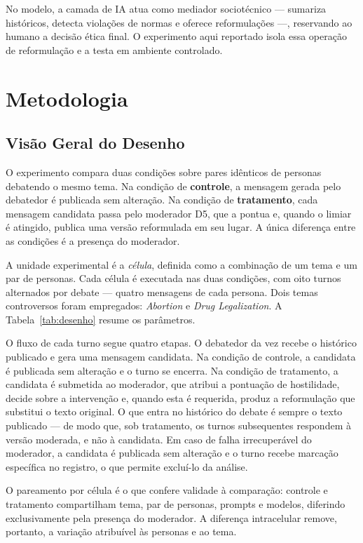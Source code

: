 \documentclass[conference]{IEEEtran} \IEEEoverridecommandlockouts %
\begin{document}
No modelo, a camada de IA atua como mediador sociotécnico — sumariza
históricos, detecta violações de normas e oferece reformulações —, reservando
ao humano a decisão ética final. O experimento aqui reportado isola essa
operação de reformulação e a testa em ambiente controlado.

\section{Metodologia}

\subsection{Visão Geral do Desenho}

O experimento compara duas condições sobre pares idênticos de personas
debatendo o mesmo tema. Na condição de \textbf{controle}, a mensagem gerada
pelo debatedor é publicada sem alteração. Na condição de \textbf{tratamento},
cada mensagem candidata passa pelo moderador D5, que a pontua e, quando o
limiar é atingido, publica uma versão reformulada em seu lugar. A única
diferença entre as condições é a presença do moderador.

A unidade experimental é a \textit{célula}, definida como a combinação de um
tema e um par de personas. Cada célula é executada nas duas condições, com
oito turnos alternados por debate — quatro mensagens de cada persona. Dois
temas controversos foram empregados: \textit{Abortion} e \textit{Drug
Legalization}. A Tabela~\ref{tab:desenho} resume os parâmetros.

O fluxo de cada turno segue quatro etapas. O debatedor da vez recebe o
histórico publicado e gera uma mensagem candidata. Na condição de controle, a
candidata é publicada sem alteração e o turno se encerra. Na condição de
tratamento, a candidata é submetida ao moderador, que atribui a pontuação de
hostilidade, decide sobre a intervenção e, quando esta é requerida, produz a
reformulação que substitui o texto original. O que entra no histórico do debate
é sempre o texto publicado — de modo que, sob tratamento, os turnos
subsequentes respondem à versão moderada, e não à candidata. Em caso de falha
irrecuperável do moderador, a candidata é publicada sem alteração e o turno
recebe marcação específica no registro, o que permite excluí-lo da análise.

O pareamento por célula é o que confere validade à comparação: controle e
tratamento compartilham tema, par de personas, prompts e modelos, diferindo
exclusivamente pela presença do moderador. A diferença intracelular remove,
portanto, a variação atribuível às personas e ao tema.
\end{document}
